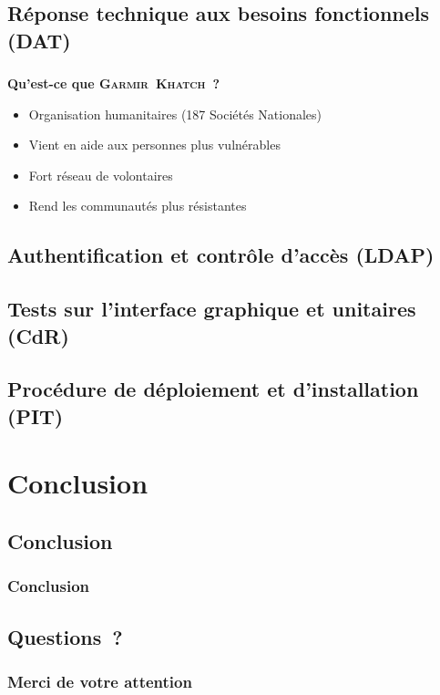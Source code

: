 \documentclass[10pt,fleqn]{beamer}
\newcommand{\mo}{\textsc{Garmir~Khatch}}
\begin{document}
\subsection[Réponse technique aux besoins fonctionnels (DAT)]{Réponse technique aux besoins fonctionnels (DAT)}
\begin{frame}
\frametitle{}
\begin{block}{\textbf{Qu'est-ce que \mo~?}}
\begin{itemize}
\item Organisation humanitaires (187 Sociétés Nationales)
\item Vient en aide aux personnes plus vulnérables
\item Fort réseau de volontaires
\item Rend les communautés plus résistantes
\end{itemize}
\end{block}
\end{frame}

\subsection[Authentification et contrôle d'accès (LDAP)]{Authentification et contrôle d'accès (LDAP)}



\subsection[Tests sur l'interface graphique et unitaires (CdR)]{Tests sur l'interface graphique et unitaires (CdR)}



\subsection[Procédure de déploiement et d'installation (PIT)]{Procédure de déploiement et d'installation (PIT)}
\begin{frame}
\end{frame}

\section[Conclusion]{Conclusion}

\subsection[Conclusion]{Conclusion}
\begin{frame}
	\frametitle{Conclusion}
\end{frame}

\subsection[Questions~?]{Questions~?}
\begin{frame}
	\frametitle{Merci de votre attention}
\end{frame}
\end{document}
